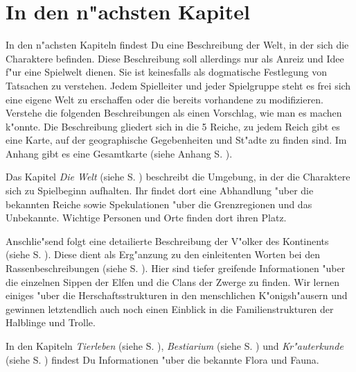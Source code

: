 \section{In den n"achsten Kapitel}
\label{diewelteinleitung}

In den n"achsten Kapiteln findest Du eine Beschreibung der Welt, in der sich die Charaktere befinden. Diese Beschreibung soll allerdings nur als Anreiz und Idee f"ur eine Spielwelt dienen. Sie ist keinesfalls als dogmatische Festlegung von Tatsachen zu verstehen. Jedem Spielleiter und jeder Spielgruppe steht es frei sich eine eigene Welt zu erschaffen oder die bereits vorhandene zu modifizieren. Verstehe die folgenden Beschreibungen als einen Vorschlag, wie man es machen k"onnte. Die Beschreibung gliedert sich in die 5 Reiche, zu jedem Reich gibt es eine Karte, auf der geographische Gegebenheiten und St"adte zu finden sind. Im Anhang gibt es eine Gesamtkarte (siehe Anhang S. \pageref{worldmap}).

\par Das Kapitel \textit{Die Welt} (siehe S. \pageref{diewelt}) beschreibt die Umgebung, in der die Charaktere sich zu Spielbeginn aufhalten. Ihr findet dort eine Abhandlung "uber die bekannten Reiche sowie Spekulationen "uber die Grenzregionen und das Unbekannte. Wichtige Personen und Orte finden dort ihren Platz.

\par Anschlie"send folgt eine detailierte Beschreibung der V"olker des Kontinents (siehe S. \pageref{dievoelker}). Diese dient als Erg"anzung zu den einleitenten Worten bei den Rassenbeschreibungen (siehe S. \pageref{dierassen}). Hier sind tiefer greifende Informationen "uber die einzelnen Sippen der Elfen und die Clans der Zwerge zu finden. Wir lernen einiges "uber die Herschaftsstrukturen in den menschlichen K"onigsh"ausern und gewinnen letztendlich auch noch einen Einblick in die Familienstrukturen der Halblinge und Trolle.

\par In den Kapiteln \textit{Tierleben} (siehe S. \pageref{tierleben}), \textit{Bestiarium} (siehe S. \pageref{bestiarium}) und \textit{Kr"auterkunde} (siehe S. \pageref{kr"auterkunde}) findest Du Informationen "uber die bekannte Flora und Fauna.

